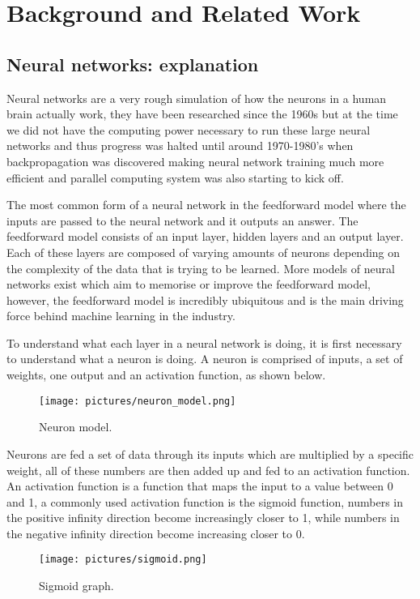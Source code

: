 \documentclass[a4paper,oneside,phd,etd]{BYUPhys}
\begin{document}
\chapter{Background and Related Work}
\label{chap:LitReview}

\section{Neural networks: explanation}
Neural networks are a very rough simulation of how the neurons in a human brain actually work\cite{neural-network-intro}, they have been researched since the 1960s\cite{neural-network-history} but at the time we did not have the computing power necessary to run these large neural networks and thus progress was halted until around 1970-1980's when backpropagation was discovered making neural network training much more efficient and parallel computing system was also starting to kick off.

The most common form of a neural network in the feedforward model where the inputs are passed to the neural network and it outputs an answer. The feedforward model consists of an input layer, hidden layers and an output layer. Each of these layers are composed of varying amounts of neurons depending on the complexity of the data that is trying to be learned. More models of neural networks exist which aim to memorise or improve the feedforward model, however, the feedforward model is incredibly ubiquitous and is the main driving force behind machine learning in the industry. 

To understand what each layer in a neural network is doing, it is first necessary to understand what a neuron is doing. A neuron is comprised of inputs, a set of weights, one output and an activation function\cite{neural-network-intro-book}, as shown below.
\begin{figure}[H]
\centering
\texttt{[image: pictures/neuron\_model.png]}
\caption{Neuron model\cite{fig:neuron_model}.}
\label{fig:neuron_model}
\end{figure}

Neurons are fed a set of data through its inputs which are multiplied by a specific weight, all of these numbers are then added up and fed to an activation function. An activation function is a function that maps the input to a value between 0 and 1, a commonly used activation function is the sigmoid function, numbers in the positive infinity direction become increasingly closer to 1, while numbers in the negative infinity direction become increasing closer to 0.
\begin{figure}[H]
\centering
\texttt{[image: pictures/sigmoid.png]}
\caption{Sigmoid graph\cite{fig:sigmoid}.}
\label{fig:sigmoid}
\end{figure}
\end{document}
